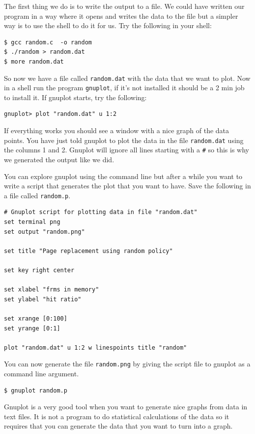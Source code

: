 \documentclass[a4paper,11pt]{article}
\begin{document}
The first thing we do is to write the output to a file. We could have
written our program in a way where it opens and writes the data to the
file but a simpler way is to use the shell to do it for us. Try the
following in your shell:

\begin{verbatim}
$ gcc random.c  -o random
$ ./random > random.dat
$ more random.dat 
\end{verbatim}

So now we have a file called {\tt random.dat} with the data that we
want to plot. Now in a shell run the program {\tt gnuplot}, if it's
not installed it should be a 2 min job to install it. If gnuplot
starts, try the following:

\begin{verbatim}
gnuplot> plot "random.dat" u 1:2
\end{verbatim}

If everything works you should see a window with a nice graph of the
data points. You have just told gnuplot to plot the data in the file
{\tt random.dat} using the columns 1 and 2. Gnuplot will ignore all
lines starting with a {\tt \#} so this is why we generated the output like we did.

You can explore gnuplot using the command line but after a while you
want to write a script that generates the plot that you want to
have. Save the following in a file called {\tt random.p}.

\begin{verbatim}
# Gnuplot script for plotting data in file "random.dat"
set terminal png
set output "random.png"

set title "Page replacement using random policy"

set key right center
    
set xlabel "frms in memory"
set ylabel "hit ratio"    

set xrange [0:100]
set yrange [0:1]

plot "random.dat" u 1:2 w linespoints title "random"
\end{verbatim}

You can now generate the file {\tt random.png} by giving the script
file to gnuplot as a command line argument.

\begin{verbatim}
$ gnuplot random.p
\end{verbatim}

Gnuplot is a very good tool when you want to generate nice graphs from
data in text files. It is not a program to do statistical calculations
of the data so it requires that you can generate the data that you
want to turn into a graph. 
\end{document}
